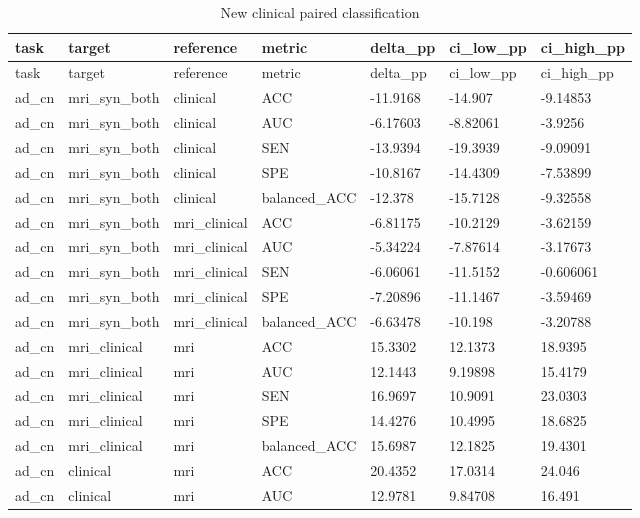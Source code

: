 \begin{landscape}
\begingroup
\footnotesize
\setlength{\tabcolsep}{4pt}
\begin{longtable}{lllllll}
\caption{New clinical paired classification}\label{tab:s-n15}\\
\toprule
task & target & reference & metric & delta\_pp & ci\_low\_pp & ci\_high\_pp \\
\midrule
\endfirsthead
\toprule
task & target & reference & metric & delta\_pp & ci\_low\_pp & ci\_high\_pp \\
\midrule
\endhead
\bottomrule
\endfoot
ad\_cn & mri\_syn\_both & clinical & ACC & -11.9168 & -14.907 & -9.14853 \\
ad\_cn & mri\_syn\_both & clinical & AUC & -6.17603 & -8.82061 & -3.9256 \\
ad\_cn & mri\_syn\_both & clinical & SEN & -13.9394 & -19.3939 & -9.09091 \\
ad\_cn & mri\_syn\_both & clinical & SPE & -10.8167 & -14.4309 & -7.53899 \\
ad\_cn & mri\_syn\_both & clinical & balanced\_ACC & -12.378 & -15.7128 & -9.32558 \\
ad\_cn & mri\_syn\_both & mri\_clinical & ACC & -6.81175 & -10.2129 & -3.62159 \\
ad\_cn & mri\_syn\_both & mri\_clinical & AUC & -5.34224 & -7.87614 & -3.17673 \\
ad\_cn & mri\_syn\_both & mri\_clinical & SEN & -6.06061 & -11.5152 & -0.606061 \\
ad\_cn & mri\_syn\_both & mri\_clinical & SPE & -7.20896 & -11.1467 & -3.59469 \\
ad\_cn & mri\_syn\_both & mri\_clinical & balanced\_ACC & -6.63478 & -10.198 & -3.20788 \\
ad\_cn & mri\_clinical & mri & ACC & 15.3302 & 12.1373 & 18.9395 \\
ad\_cn & mri\_clinical & mri & AUC & 12.1443 & 9.19898 & 15.4179 \\
ad\_cn & mri\_clinical & mri & SEN & 16.9697 & 10.9091 & 23.0303 \\
ad\_cn & mri\_clinical & mri & SPE & 14.4276 & 10.4995 & 18.6825 \\
ad\_cn & mri\_clinical & mri & balanced\_ACC & 15.6987 & 12.1825 & 19.4301 \\
ad\_cn & clinical & mri & ACC & 20.4352 & 17.0314 & 24.046 \\
ad\_cn & clinical & mri & AUC & 12.9781 & 9.84708 & 16.491 \\

\end{longtable}
\end{landscape}
